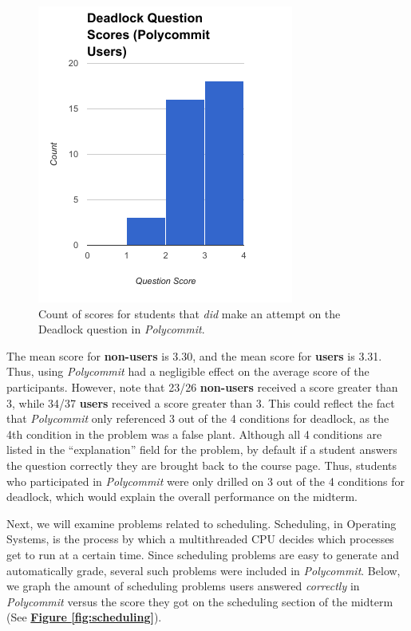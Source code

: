 \begin{figure}[h!b]
	\includegraphics[width=0.5\linewidth]{figures/deadlock-users}
	\caption{Count of scores for students that \textit{did} make an attempt on the Deadlock question in \textit{Polycommit}.}
	\label{fig:deadlock-yes}
\end{figure}

\par The mean score for \textbf{non-users} is 3.30, and the mean score for \textbf{users} is 3.31. Thus, using \textit{Polycommit} had a negligible effect on the average score of the participants. However, note that 23/26 \textbf{non-users} received a score greater than 3, while 34/37 \textbf{users} received a score greater than 3. This could reflect the fact that \textit{Polycommit} only referenced 3 out of the 4 conditions for deadlock, as the 4th condition in the problem was a false plant. Although all 4 conditions are listed in the ``explanation'' field for the problem, by default if a student answers the question correctly they are brought back to the course page. Thus, students who participated in \textit{Polycommit} were only drilled on 3 out of the 4 conditions for deadlock, which would explain the overall performance on the midterm.

\par Next, we will examine problems related to scheduling. Scheduling, in Operating Systems, is the process by which a multithreaded CPU decides which processes get to run at a certain time. Since scheduling problems are easy to generate and automatically grade, several such problems were included in \textit{Polycommit}. Below, we graph the amount of scheduling problems users answered \textit{correctly} in \textit{Polycommit} versus the score they got on the scheduling section of the midterm (See \textbf{\hyperref[fig:scheduling]{Figure \ref*{fig:scheduling}}}).

